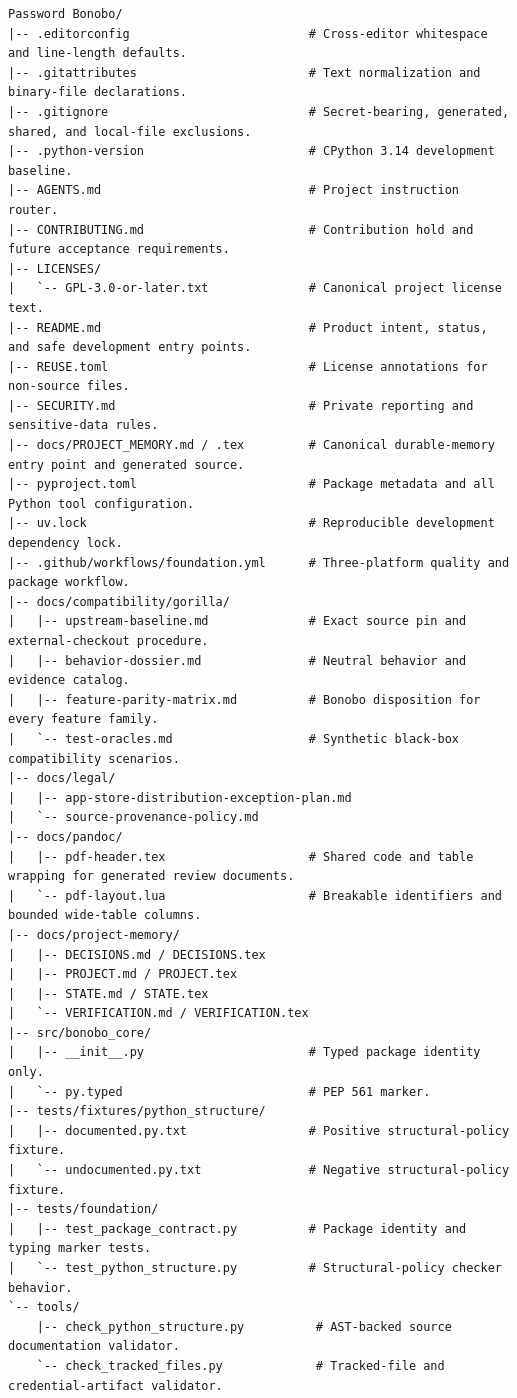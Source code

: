 \documentclass[
  letterpaper,
]{article}
\begin{document}
\begin{lstlisting}
Password Bonobo/
|-- .editorconfig                         # Cross-editor whitespace and line-length defaults.
|-- .gitattributes                        # Text normalization and binary-file declarations.
|-- .gitignore                            # Secret-bearing, generated, shared, and local-file exclusions.
|-- .python-version                       # CPython 3.14 development baseline.
|-- AGENTS.md                             # Project instruction router.
|-- CONTRIBUTING.md                       # Contribution hold and future acceptance requirements.
|-- LICENSES/
|   `-- GPL-3.0-or-later.txt              # Canonical project license text.
|-- README.md                             # Product intent, status, and safe development entry points.
|-- REUSE.toml                            # License annotations for non-source files.
|-- SECURITY.md                           # Private reporting and sensitive-data rules.
|-- docs/PROJECT_MEMORY.md / .tex         # Canonical durable-memory entry point and generated source.
|-- pyproject.toml                        # Package metadata and all Python tool configuration.
|-- uv.lock                               # Reproducible development dependency lock.
|-- .github/workflows/foundation.yml      # Three-platform quality and package workflow.
|-- docs/compatibility/gorilla/
|   |-- upstream-baseline.md              # Exact source pin and external-checkout procedure.
|   |-- behavior-dossier.md               # Neutral behavior and evidence catalog.
|   |-- feature-parity-matrix.md          # Bonobo disposition for every feature family.
|   `-- test-oracles.md                   # Synthetic black-box compatibility scenarios.
|-- docs/legal/
|   |-- app-store-distribution-exception-plan.md
|   `-- source-provenance-policy.md
|-- docs/pandoc/
|   |-- pdf-header.tex                    # Shared code and table wrapping for generated review documents.
|   `-- pdf-layout.lua                    # Breakable identifiers and bounded wide-table columns.
|-- docs/project-memory/
|   |-- DECISIONS.md / DECISIONS.tex
|   |-- PROJECT.md / PROJECT.tex
|   |-- STATE.md / STATE.tex
|   `-- VERIFICATION.md / VERIFICATION.tex
|-- src/bonobo_core/
|   |-- __init__.py                       # Typed package identity only.
|   `-- py.typed                          # PEP 561 marker.
|-- tests/fixtures/python_structure/
|   |-- documented.py.txt                 # Positive structural-policy fixture.
|   `-- undocumented.py.txt               # Negative structural-policy fixture.
|-- tests/foundation/
|   |-- test_package_contract.py          # Package identity and typing marker tests.
|   `-- test_python_structure.py          # Structural-policy checker behavior.
`-- tools/
    |-- check_python_structure.py          # AST-backed source documentation validator.
    `-- check_tracked_files.py             # Tracked-file and credential-artifact validator.
\end{lstlisting}
\end{document}
